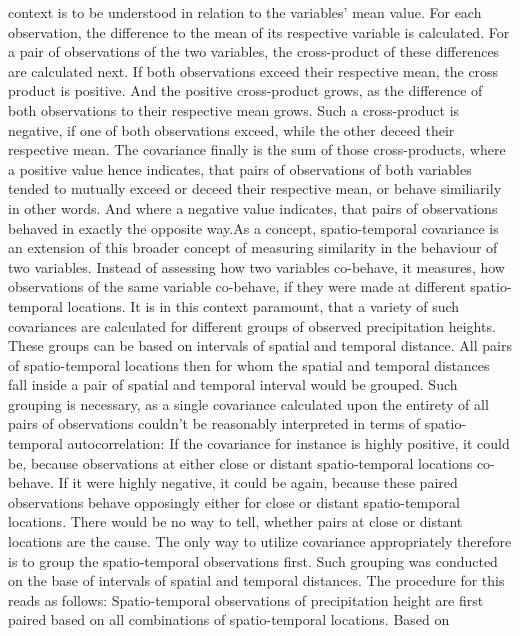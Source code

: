 \documentclass[
  12pt,
]{article}
\begin{document}
context is to be understood in relation to the variables' mean value.
For each observation, the difference to the mean of its respective
variable is calculated. For a pair of observations of the two variables,
the cross-product of these differences are calculated next. If both
observations exceed their respective mean, the cross product is
positive. And the positive cross-product grows, as the difference of
both observations to their respective mean grows. Such a cross-product
is negative, if one of both observations exceed, while the other deceed
their respective mean. The covariance finally is the sum of those
cross-products, where a positive value hence indicates, that pairs of
observations of both variables tended to mutually exceed or deceed their
respective mean, or behave similiarily in other words. And where a
negative value indicates, that pairs of observations behaved in exactly
the opposite way.\newline As a concept, spatio-temporal covariance is an
extension of this broader concept of measuring similarity in the
behaviour of two variables. Instead of assessing how two variables
co-behave, it measures, how observations of the same variable co-behave,
if they were made at different spatio-temporal locations. It is in this
context paramount, that a variety of such covariances are calculated for
different groups of observed precipitation heights. These groups can be
based on intervals of spatial and temporal distance. All pairs of
spatio-temporal locations then for whom the spatial and temporal
distances fall inside a pair of spatial and temporal interval would be
grouped. Such grouping is necessary, as a single covariance calculated
upon the entirety of all pairs of observations couldn't be reasonably
interpreted in terms of spatio-temporal autocorrelation: If the
covariance for instance is highly positive, it could be, because
observations at either close or distant spatio-temporal locations
co-behave. If it were highly negative, it could be again, because these
paired observations behave opposingly either for close or distant
spatio-temporal locations. There would be no way to tell, whether pairs
at close or distant locations are the cause. The only way to utilize
covariance appropriately therefore is to group the spatio-temporal
observations first. Such grouping was conducted on the base of intervals
of spatial and temporal distances. The procedure for this reads as
follows: Spatio-temporal observations of precipitation height are first
paired based on all combinations of spatio-temporal locations. Based on
\end{document}
